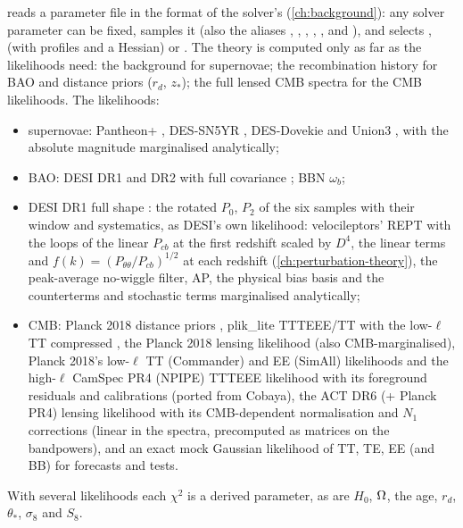 reads a parameter file in the format of the solver's  (\cref{ch:background}): any solver parameter can be fixed,  samples it (also the aliases , , , , ,  and
), and  selects ,  (with profiles and a Hessian) or . The theory is computed only as far as
the likelihoods need: the background for supernovae; the recombination history for BAO and distance priors ($r_d$, $z_*$); the full lensed CMB spectra for the
CMB likelihoods. The likelihoods:
\begin{itemize}
\item supernovae: Pantheon+ \cite{Brout2022}, DES-SN5YR \cite{DESY5}, DES-Dovekie \cite{Popovic2025} and Union3 \cite{Rubin2023}, with the absolute magnitude
      marginalised analytically;
\item BAO: DESI DR1 and DR2 with full covariance \cite{DESI2025}; BBN $\omega_b$;
\item DESI DR1 full shape \cite{DESI2024VII}: the rotated $P_0$, $P_2$ of the six samples with their window and systematics, as DESI's own likelihood: velocileptors'
      REPT with the loops of the linear $P_{cb}$ at the first redshift scaled by $D^4$, the linear terms and $f(k)=(P_{\theta\theta}/P_{cb})^{1/2}$ at each redshift
      (\cref{ch:perturbation-theory}), the peak-average no-wiggle filter, AP, the physical bias basis and the counterterms and stochastic terms marginalised analytically;
\item CMB: Planck 2018 distance priors \cite{Chen2019DP}, plik\_lite TTTEEE/TT with the low-$\ell$ TT compressed \cite{Planck2018spectra,PrinceDunkley2019}, the Planck 2018
      lensing likelihood \cite{Planck2018lensing} (also CMB-marginalised), Planck 2018's low-$\ell$ TT (Commander) and EE (SimAll) likelihoods
      \cite{Planck2018spectra} and the high-$\ell$ CamSpec PR4 (NPIPE) TTTEEE likelihood \cite{Rosenberg2022} with its foreground residuals and calibrations (ported from
      Cobaya), the ACT DR6 (+ Planck PR4) lensing likelihood \cite{Madhavacheril2023,Qu2023} with its CMB-dependent normalisation and $N_1$ corrections
      (linear in the spectra, precomputed as matrices on the bandpowers), and an exact mock Gaussian likelihood of TT, TE, EE (and BB) for forecasts and tests.
\end{itemize}
With several likelihoods each $\chi^2$ is a derived parameter, as are $H_0$, $\Omega$, the age, $r_d$, $\theta_*$, $\sigma_8$ and $S_8$.

